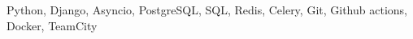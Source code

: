 \documentclass[a4paper, 12pt]{article}
\begin{document}
Python, Django, Asyncio, PostgreSQL, SQL, Redis, Celery, Git, Github actions, Docker, TeamCity
\end{document}
